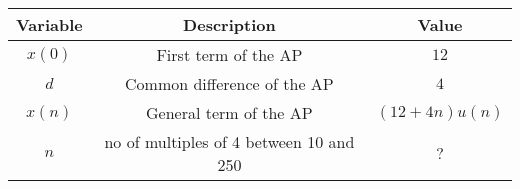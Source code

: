 \begin{tabular}[12.1pt]{ |c| c| c|}
    \hline
    \textbf{Variable} & \textbf{Description} &\textbf{Value}\\ 
    \hline
    $x(0)$ & First term of the AP & $12$ \\
    \hline 
    $d$ & Common difference of the AP &$4$ \\
    \hline 
    $x(n)$ & General term of the AP & $(12+4n)u(n)$\\
    \hline
   $n$ & no of multiples of 4 between 10 and 250 & $?$\\
   \hline
    \end{tabular}
